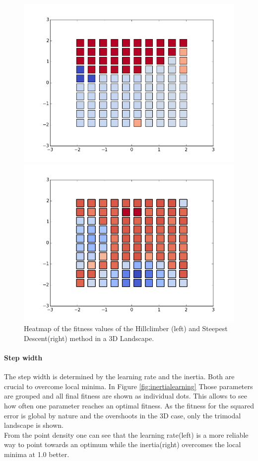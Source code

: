 \documentclass{scrartcl}
\begin{document}
\begin{figure}[H]
\centering
\begin{minipage}{.5\textwidth}
  \centering
  \includegraphics[width=.8\linewidth]{img/ex1/Heatmap_HC.png}
\end{minipage}%
\begin{minipage}{.5\textwidth}
  \centering
  \includegraphics[width=.8\linewidth]{img/ex1/Heatmap_SS.png}
\end{minipage}
\caption{Heatmap of the fitness values of the Hillclimber (left) and Steepest Descent(right) method in a 3D Landscape.}
\label{fig:heatmap}
\end{figure}

\paragraph{Step width}
The step width is determined by the learning rate and the inertia. Both are crucial to overcome local minima. In Figure \ref{fig:inertialearning} Those parameters are grouped and all final fitness are shown as individual dots. This allows to see how often one parameter reaches an optimal fitness.
As the fitness for the squared error is global by nature and the overshoots in the 3D case, only the trimodal landscape is shown.\\
From the point density one can see that the learning rate(left) is a more reliable way to point towards an optimum while the inertia(right) overcomes the local minima at 1.0 better.
\end{document}
